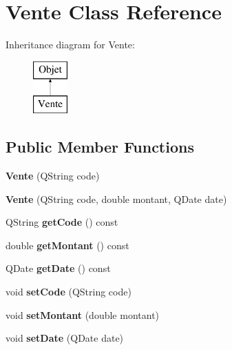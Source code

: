 \hypertarget{class_vente}{
\section{Vente Class Reference}
\label{class_vente}
}
Inheritance diagram for Vente:\begin{figure}[H]
\begin{center}
\leavevmode
\includegraphics[height=2.000000cm]{class_vente}
\end{center}
\end{figure}
\subsection*{Public Member Functions}
\begin{DoxyCompactItemize}
\item 
\hypertarget{class_vente_a8c8075658f829ed29559948ecd612ec7}{
{\bfseries Vente} (QString code)}
\label{class_vente_a8c8075658f829ed29559948ecd612ec7}

\item 
\hypertarget{class_vente_a53b75b82b0582e3ebb68a7285e33a259}{
{\bfseries Vente} (QString code, double montant, QDate date)}
\label{class_vente_a53b75b82b0582e3ebb68a7285e33a259}

\item 
\hypertarget{class_vente_a6659a83ddd59f8ad810ca6e1b09e32aa}{
QString {\bfseries getCode} () const }
\label{class_vente_a6659a83ddd59f8ad810ca6e1b09e32aa}

\item 
\hypertarget{class_vente_a9674211d276fa1569f1e69eac769756b}{
double {\bfseries getMontant} () const }
\label{class_vente_a9674211d276fa1569f1e69eac769756b}

\item 
\hypertarget{class_vente_a9ab711f587a861c6b2e6768609484d44}{
QDate {\bfseries getDate} () const }
\label{class_vente_a9ab711f587a861c6b2e6768609484d44}

\item 
\hypertarget{class_vente_ad9f91ada87060429df1d27d19ef33bed}{
void {\bfseries setCode} (QString code)}
\label{class_vente_ad9f91ada87060429df1d27d19ef33bed}

\item 
\hypertarget{class_vente_a677beec64364cb24854928f19b6953b3}{
void {\bfseries setMontant} (double montant)}
\label{class_vente_a677beec64364cb24854928f19b6953b3}

\item 
\hypertarget{class_vente_a504fec1c6a29ba2d5e96018cd9d12266}{
void {\bfseries setDate} (QDate date)}
\label{class_vente_a504fec1c6a29ba2d5e96018cd9d12266}

\end{DoxyCompactItemize}
